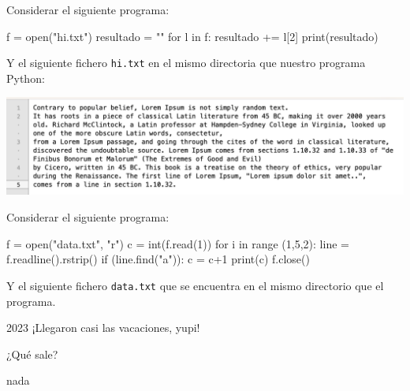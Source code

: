 \begin{ejercicio}
Considerar el siguiente programa: 


\begin{python}
f = open("hi.txt")
resultado = ""
for l in f:
    resultado += l[2]
print(resultado)
\end{python}

Y el siguiente fichero \verb+hi.txt+ en el mismo directoria que nuestro programa Python:
 
\includegraphics[width = 16cm]{book/Spanish/06_Ficheros/images/hi_ficherox.png}

\begin{choices}
    \choice {} %
    \choice {}
    \choice {}
    \choice {}
\end{choices}

\end{ejercicio}

\begin{ejercicio}
    Considerar el siguiente programa:


\begin{python}
f = open("data.txt", "r")
c = int(f.read(1))
for i in range (1,5,2):
    line = f.readline().rstrip()
    if (line.find("a")):
        c = c+1
print(c)
f.close()
\end{python}
 
Y el siguiente fichero \texttt{data.txt} que se encuentra en el mismo directorio que el programa.
 
 \begin{python}
2023
¡Llegaron casi las vacaciones, yupi!
\end{python}

¿Qué sale?

\begin{choices}
      \choice {} %
    \choice  {}
    \choice nada
  \choice {}
\end{choices}
\end{ejercicio}


